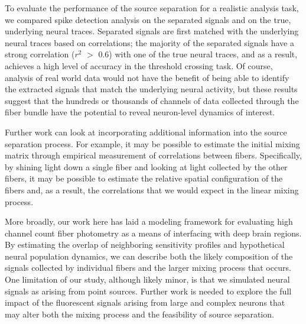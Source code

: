 To evaluate the performance of the source separation for a realistic analysis task, we compared spike detection analysis on the separated signals and on the true, underlying neural traces. Separated signals are first matched with the underlying neural traces based on correlations; the majority of the separated signals have a strong correlation ($r^2$ $>$ 0.6) with one of the true neural traces, and as a result, achieves a high level of accuracy in the threshold crossing task. Of course, analysis of real world data would not have the benefit of being able to identify the extracted signals that match the underlying neural activity, but these results suggest that the hundreds or thousands of channels of data collected through the fiber bundle have the potential to reveal neuron-level dynamics of interest.

Further work can look at incorporating additional information into the source separation process. For example, it may be possible to estimate the initial mixing matrix through empirical measurement of correlations between fibers. Specifically, by shining light down a single fiber and looking at light collected by the other fibers, it may be possible to estimate the relative spatial configuration of the fibers and, as a result, the correlations that we would expect in the linear mixing process.

More broadly, our work here has laid a modeling framework for evaluating high channel count fiber photometry as a means of interfacing with deep brain regions. By estimating the overlap of neighboring sensitivity profiles and hypothetical neural population dynamics, we can describe both the likely composition of the signals collected by individual fibers and the larger mixing process that occurs. One limitation of our study, although likely minor, is that we simulated neural signals as arising from point sources. Further work is needed to explore the full impact of the fluorescent signals arising from large and complex neurons that may alter both the mixing process and the feasibility of source separation.

